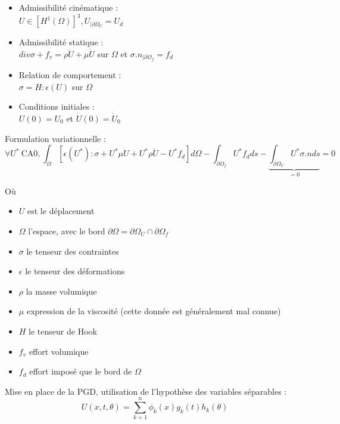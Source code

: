 %
%
\begin{itemize}
\item Admissibilité cinématique :
	\\$U \in [H^1(\Omega)]^3, U_{|\partial \Omega_U} = U_d $
\item Admissibilité statique :
	\\$ div \sigma + f_v = \rho \ddot{U} + \mu \dot{U}$ sur $\Omega$ 
		et $\sigma . n _{|\partial \Omega_f} = f_d$
\item Relation de comportement :
	\\$\sigma = H : \epsilon (U)$ sur $ \Omega$
\item Conditions initiales :
	\\$U(0) = U_0$ et $ \dot{U}(0) = \dot{U}_0$
\end{itemize}

\noindent
Formulation variationnelle : 
\begin{equation}
	\forall U^* ~ \text{CA0,} ~
		\int_\Omega [\epsilon (U^*) : \sigma   
					+ U^* \mu \dot{U} 
					+ U^* \rho \ddot{U}
					- U^* f_d
					] d \Omega	
		- \int_{\partial \Omega_f} U^* f_d  ds		
		- \underbrace{
			\int_{\partial \Omega_U} U^* \sigma . n ds	
		  }_{=0}
		= 0
\end{equation}

\noindent
Où
\begin{itemize}
\item $U$ est le déplacement
\item $\Omega$ l'espace, avec le bord $\partial \Omega = \partial \Omega_U \cap \partial \Omega_f$
\item $\sigma$ le tenseur des contraintes
\item $\epsilon$ le tenseur des déformations
\item $\rho$ la masse volumique
\item $\mu$ expression de la viscosité (cette donnée est généralement mal connue)
\item $H$ le tenseur de Hook
\item $f_v$ effort volumique
\item $f_d$ effort imposé que le bord de $\Omega$
\end{itemize}
\vspace{0.3cm}

\noindent
Mise en place de la PGD, utilisation de l'hypothèse des variables séparables :
\begin{equation}
	U(x,t,\theta) = \sum_{k=1}^n \phi_k(x) g_k(t)h_k(\theta)
\end{equation}

